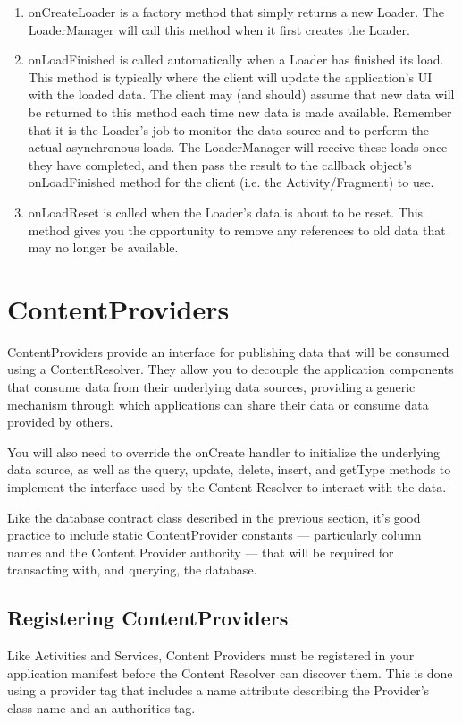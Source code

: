 \begin{enumerate}
	\item onCreateLoader is a factory method that simply returns a new Loader. The LoaderManager will call this method when it first creates the Loader.
	
	\item onLoadFinished is called automatically when a Loader has finished its load. This method is typically where the client will update the application’s UI with the loaded data. The client may (and should) assume that new data will be returned to this method each time new data is made available. Remember that it is the Loader’s job to monitor the data source and to perform the actual asynchronous loads. The LoaderManager will receive these loads once they have completed, and then pass the result to the callback object’s onLoadFinished method for the client (i.e. the Activity/Fragment) to use.
	
	\item onLoadReset is called when the Loader’s data is about to be reset. This method gives you the opportunity to remove any references to old data that may no longer be available.
\end{enumerate}

\section{ContentProviders}
ContentProviders  provide an interface for publishing data that will be consumed using a ContentResolver. They allow you to decouple the application components that consume data from their underlying data sources, providing a generic mechanism through which applications can share their data or consume data provided by others.

You will also need to override the onCreate handler to initialize the underlying data source, as well as the query, update, delete, insert, and getType methods to implement the interface used by the Content Resolver to interact with the data.

\begin{framed}
	Like the database contract class described in the previous section, it’s good practice to include static ContentProvider constants — particularly column names and the Content Provider authority — that will be required for transacting with, and querying, the database.
\end{framed}

\subsection{Registering ContentProviders}
Like Activities and Services, Content Providers must be registered in your application manifest before the Content Resolver can discover them. This is done using a provider tag that includes a name attribute describing the Provider’s class name and an authorities tag.

